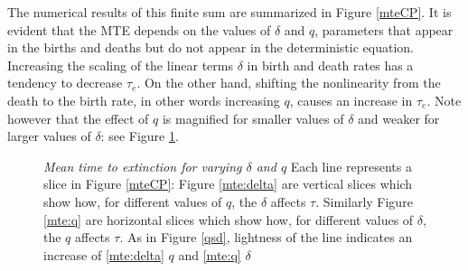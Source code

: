 The numerical results of this finite sum are summarized in Figure \ref{mteCP}.
It is evident that the MTE depends on the values of $\delta$ and $q$, parameters that appear in the births and deaths but do not appear in the deterministic equation.
Increasing the scaling of the linear terms $\delta$ in birth and death rates has a tendency to decrease $\tau_e$.
On the other hand, shifting the nonlinearity from the death to the birth rate, in other words increasing $q$, causes an increase in $\tau_e$.
Note however that the effect of $q$ is magnified for smaller values of $\delta$ and weaker for larger values of $\delta$: see Figure \ref{mte}.

\begin{figure}[ht!]
  \centering
  \hfill
  \caption{\emph{Mean time to extinction for varying $\delta$ and $q$} Each line represents a slice in Figure \ref{mteCP}: Figure \ref{mte:delta} are vertical slices which show how, for different values of $q$, the $\delta$ affects $\tau$. Similarly Figure \ref{mte:q} are horizontal slices which show how, for different values of $\delta$, the $q$ affects $\tau$. As in Figure \ref{qsd}, lightness of the line indicates an increase of \ref{mte:delta} $q$ and \ref{mte:q} $\delta$}
  \label{mte}
\end{figure}
